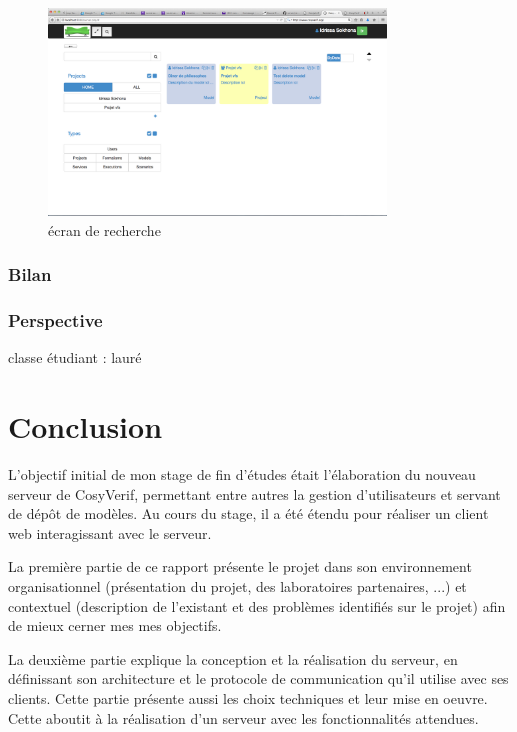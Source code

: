 \documentclass{report}
\begin{document}
\newpage

\begin{figure}[h!]
     \centering
     \includegraphics[width=0.8\textwidth] {img/1-ecran-recherche}
     \caption{écran de recherche}
\end{figure}







\subsection{Bilan}
\subsection{Perspective}
classe étudiant : lauré



\chapter*{Conclusion}

L'objectif initial de mon stage de fin d'études était l'élaboration du
nouveau serveur de CosyVerif, permettant entre autres la gestion
d'utilisateurs et servant de dépôt de modèles.
Au cours du stage, il a été étendu pour réaliser un client web interagissant avec le serveur.

La première partie de ce rapport présente le projet dans son environnement organisationnel
(présentation du projet, des laboratoires partenaires, ...)
et contextuel (description de l'existant et des problèmes identifiés sur le
projet)
afin de mieux cerner mes mes objectifs.

La deuxième partie explique la conception et la réalisation du serveur, en définissant son architecture et le protocole de communication
qu'il utilise avec ses clients. Cette partie présente aussi les choix
techniques et leur mise en oeuvre.
Cette aboutit à la réalisation d'un serveur avec les fonctionnalités attendues.
\end{document}
